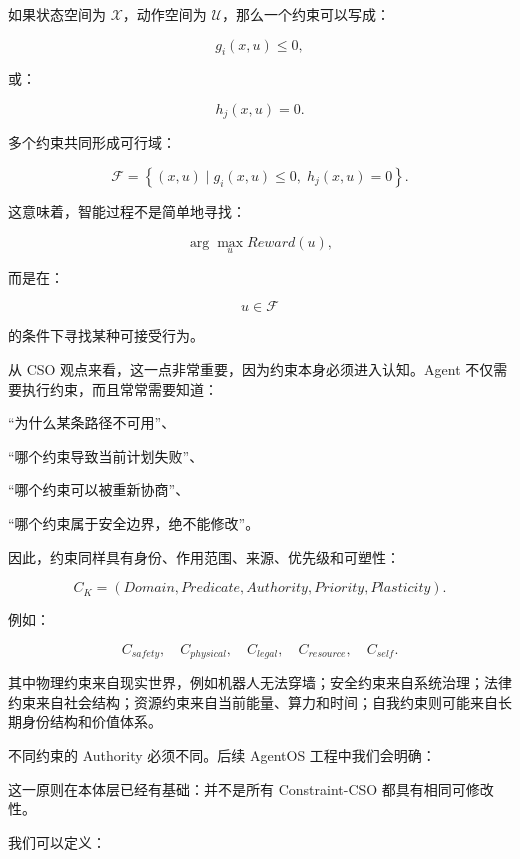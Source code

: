 \begin{statementbox}
\centering
{}
\end{statementbox}

如果状态空间为 \(\mathcal X\)，动作空间为 \(\mathcal U\)，那么一个约束可以写成：

\[
g_i(x,u)\leq 0,
\]

或：

\[
h_j(x,u)=0.
\]

多个约束共同形成可行域：

\[
\boxed{
\mathcal F
=
\left\{
(x,u)
\mid
g_i(x,u)\leq0,
\;
h_j(x,u)=0
\right\}.
}
\]

这意味着，智能过程不是简单地寻找：

\[
\arg\max_u Reward(u),
\]

而是在：

\[
u\in\mathcal F
\]

的条件下寻找某种可接受行为。

从 CSO 观点来看，这一点非常重要，因为约束本身必须进入认知。Agent 不仅需要执行约束，而且常常需要知道：

“为什么某条路径不可用”、

“哪个约束导致当前计划失败”、

“哪个约束可以被重新协商”、

“哪个约束属于安全边界，绝不能修改”。

因此，约束同样具有身份、作用范围、来源、优先级和可塑性：

\[
C_K
=
(
Domain,
Predicate,
Authority,
Priority,
Plasticity
).
\]

例如：

\[
C_{safety},
\quad
C_{physical},
\quad
C_{legal},
\quad
C_{resource},
\quad
C_{self}.
\]

其中物理约束来自现实世界，例如机器人无法穿墙；安全约束来自系统治理；法律约束来自社会结构；资源约束来自当前能量、算力和时间；自我约束则可能来自长期身份结构和价值体系。

不同约束的 Authority 必须不同。后续 AgentOS 工程中我们会明确：

\begin{statementbox}
\centering
{}
\end{statementbox}

这一原则在本体层已经有基础：并不是所有 Constraint-CSO 都具有相同可修改性。

我们可以定义：

